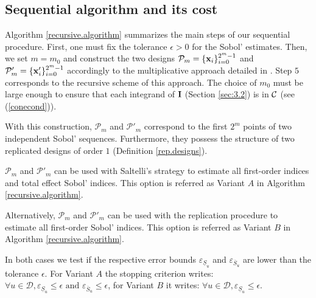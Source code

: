 \subsection{Sequential algorithm and its cost}
\label{sec:4.1}

Algorithm \ref{recursive.algorithm} summarizes the main steps of our sequential procedure. First, one must fix the tolerance $\epsilon >0$ for the Sobol' estimates. Then, we set $m=m_0$ and construct the two designs $\mathcal{P}_{m}=\{\boldsymbol{\mathbf{x}}_i\}_{i=0}^{2^{m}-1}$ and $\mathcal{P}'_{m}=\{\boldsymbol{\mathbf{x}}'_i\}_{i=0}^{2^{m}-1}$ accordingly to the multiplicative approach detailed in \cite{GJAHMP}.  Step $5$ corresponds to the recursive scheme of this approach. The choice of $m_0$ must be large enough to ensure that each integrand of $\boldsymbol{\mathbf{I}}$ (Section \ref{sec:3.2}) is in $\mathcal{C}$ (see  (\ref{conecond})).

With this construction, $\mathcal{P}_{m}$ and $\mathcal{P}'_{m}$ correspond to the first $2^{m}$ points of two independent Sobol' sequences. Furthermore, they possess the structure of two replicated designs of order $1$ (Definition \ref{rep.designs}).
\bigskip

$\mathcal{P}_{m}$ and $\mathcal{P}'_{m}$ can be used with Saltelli's strategy to estimate all first-order indices and total effect Sobol' indices. This option is referred as Variant $A$ in Algorithm \ref{recursive.algorithm}.

Alternatively, $\mathcal{P}_{m}$ and $\mathcal{P}'_{m}$ can be used with the replication procedure to estimate all first-order Sobol' indices. This option is referred as Variant $B$ in Algorithm \ref{recursive.algorithm}. 

In both cases we test if the respective error bounds $\varepsilon_{\underline{S}_u}$ and $\varepsilon_{\overline{S}_u}$ are lower than the tolerance $\epsilon$. For Variant $A$ the stopping criterion writes: $ \forall u \in \mathcal{D}, \varepsilon_{\underline{S}_u} \leq \epsilon \text{ and } \varepsilon_{\overline{S}_u} \leq \epsilon$,
for Variant $B$ it writes:
$ \forall u \in \mathcal{D}, \varepsilon_{\underline{S}_u} \leq \epsilon.$ 

